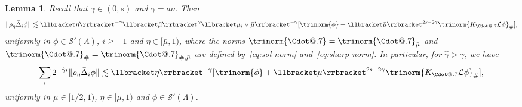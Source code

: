 \documentclass{article}
\makeatletter
\numberwithin{equation}{section}
\newcommand*\Cdot{{\mathpalette\Cdot@{.7}}}
\newcommand*\Cdot@[2]{\mathbin{\vcenter{\hbox{\scalebox{#2}{\hspace{0.1mm}$\m@th#1\bullet$\hspace{0.1mm}}}}}}
\theoremstyle{plain}
\newtheorem{lemma}[theorem]{Lemma}
\theoremstyle{definition}
\makeatother
\begin{document}
\begin{lemma}
  \label{lem:schauder-full}
  Recall that $\gamma\in(0,s)$ and $\gamma=a\nu$. Then
  \begin{equation}
    \| \rho_{\eta} \bar{\Delta}_i  \phi \| \lesssim \llbracket \eta
    \rrbracket^{- \gamma} \llbracket \bar{\mu} \rrbracket^{\gamma} \llbracket
    \mu_i \vee \bar{\mu} \rrbracket^{- \gamma} [\trinorm{ \phi } +
    \llbracket \bar{\mu} \rrbracket^{2 s - 2 \gamma} \trinorm{ K_{\Cdot}
    \mathcal{L} \phi }_{\#}], \label{eq:schauder}
  \end{equation}
  uniformly in $\phi \in \mathcal{S}' (\Lambda)$, $i \geqslant - 1$ and $\eta
  \in [\bar{\mu}, 1)$, where the norms $\trinorm{ \Cdot } =
  \trinorm{ \Cdot }_{\bar{\mu}}$ and $\trinorm{ \Cdot
  }_{\#} = \trinorm{ \Cdot }_{\#, \bar{\mu}}$
  are defined by~\eqref{eq:sol-norm} and~\eqref{eq:sharp-norm}. In particular,
  for $\hat{\gamma} > \gamma$, we have
  \[ \sum_i 2^{- \hat{\gamma} i}  \| \rho_{\eta} \bar{\Delta}_i  \phi \|
     \lesssim \llbracket \eta \rrbracket^{- \gamma} [\trinorm{ \phi
     } + \llbracket \bar{\mu} \rrbracket^{2 s - 2 \gamma}
     \trinorm{ K_{\Cdot} \mathcal{L} \phi }_{\#}], \]
  uniformly in $\bar{\mu} \in [1 / 2, 1)$, $\eta \in [\bar{\mu}, 1)$ and $\phi
  \in \mathcal{S}' (\Lambda)$.
\end{lemma}
\end{document}
